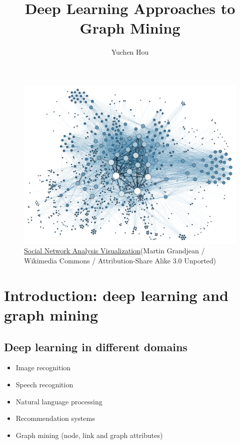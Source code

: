 \documentclass{article}
\begin{document}
\lstset{language=python, tabsize=4}
\title{Deep Learning Approaches to Graph Mining}
\author{Yuchen Hou}
\maketitle

\begin{figure}[H]
	\centering
	\includegraphics[width=\linewidth]{Social_Network_Analysis_Visualization}
	\caption{ \href{https://commons.wikimedia.org/wiki/File:Social_Network_Analysis_Visualization.png}{Social Network Analysis Visualization}(Martin Grandjean / Wikimedia Commons / Attribution-Share Alike 3.0 Unported)}
	\label{fig:Social_Network_Analysis_Visualization}
\end{figure}

\section{Introduction: deep learning and graph mining}

\subsection{Deep learning in different domains}
\begin{itemize}
	\item Image recognition
	\item Speech recognition
	\item Natural language processing
	\item Recommendation systems
	\item Graph mining (node, link and graph attributes)
\end{itemize}
\end{document}
